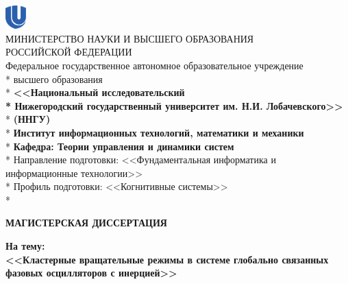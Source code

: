 \begin{titlepage}
	\newpage
	\begin{center}
		\includegraphics[width=0.8cm]{logo_unn_crop.eps} \\
		МИНИСТЕРСТВО  НАУКИ И ВЫСШЕГО ОБРАЗОВАНИЯ \\ 
		РОССИЙСКОЙ  ФЕДЕРАЦИИ  \\
		Федеральное государственное автономное образовательное учреждение\\* высшего образования \\*
		\textbf{<<Национальный исследовательский \\* Нижегородский государственный университет им. Н.И. Лобачевского>>}\\*
		\textbf{(ННГУ)}\\*
		\vspace{2em}
		\textbf{Институт информационных технологий, математики и механики}\\*
		\textbf{Кафедра: Теории управления и динамики систем}\\*
		\vspace{2em}
		Направление подготовки: <<Фундаментальная информатика и информационные технологии>>\\*
		Профиль подготовки: <<Когнитивные системы>>\\*
	\end{center}

	\vspace{1em}

	\begin{center}
		{\Large \textbf{МАГИСТЕРСКАЯ ДИССЕРТАЦИЯ}}
    \end{center}

    \vspace{2.5em}

	\begin{center}
		{\textbf{На тему:}}\\
		
		{\large \textbf{<<Кластерные вращательные режимы в системе глобально связанных фазовых осцилляторов с инерцией>>}}
	\end{center}

    \vspace{4em}

    \hfill
    \begin{minipage}[t]{.36\linewidth}
    	\begin{flushleft}
    	

\end{flushleft}
\end{minipage}
\end{titlepage}
